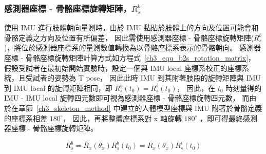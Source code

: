 \subsubsection{感測器座標 - 骨骼座標旋轉矩陣，$R^b_s$}
使用 IMU 進行肢體朝向量測時，由於 IMU 黏貼於肢體上的方向及位置可能會和骨骼定義之方向及位置有所偏差，
因此需使用感測器座標 - 骨骼座標旋轉矩陣($R^b_s$)，將位於感測器座標系的量測數值轉換為以骨骼座標系表示的骨骼朝向。
感測器座標 - 骨骼座標旋轉矩陣計算方式如方程式~\ref{ch3_equ_b2s_rotation_matrix}，
假設受試者在最初始開始實驗時，設定一個與 IMU local 座標系校正的座標系統，且受試者的姿勢為 T pose，
因此此時 IMU 到其附著肢段的旋轉矩陣與 IMU 到 IMU local 的旋轉矩陣相同，即 $R^{b}_{s}(t_0) = R^{i}_{s}(t_0)$，
因此，在 $t_0$ 時刻量得的 IMU - IMU local 旋轉四元數即可視為感測器座標 - 骨骼座標旋轉四元數，
而由於在章節~\ref{ch3_skeleton_method} 中建立的人體模型座標與 IMU 附著於骨骼定義的座標系相差 $180^{\circ}$，
因此，再將整體座標系對 x 軸旋轉 $180^{\circ}$ ，即可得最終感測器座標 - 骨骼座標旋轉矩陣。 

\begin{equation}
   R^{b}_{s} = R_{x}(\theta_{x})R^{b}_{s}(t_0) = R_{x}(\theta_{x})R^{i}_{s}(t_0)
   \label{ch3_equ_b2s_rotation_matrix}
\end{equation}


